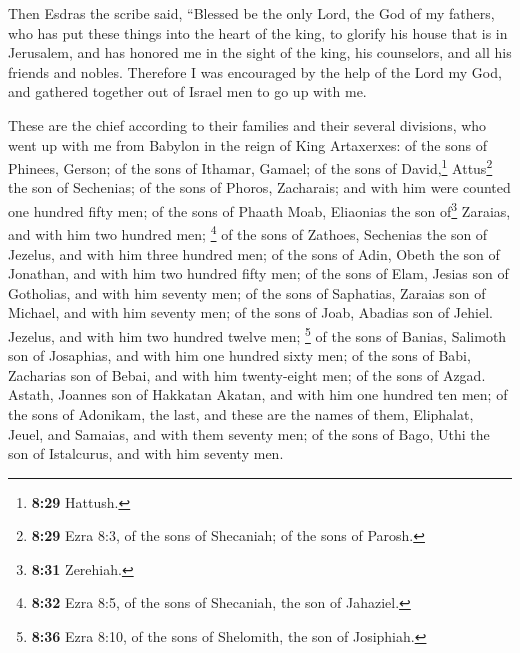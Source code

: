  Then Esdras the scribe said, ``Blessed be the only Lord,
the God of my fathers, who has put these things into the heart of the
king, to glorify his house that is in Jerusalem,  and has
honored me in the sight of the king, his counselors, and all his friends
and nobles.  Therefore I was encouraged by the help of
the Lord my God, and gathered together out of Israel men to go up with
me.

 These are the chief according to their families and
their several divisions, who went up with me from Babylon in the reign
of King Artaxerxes:  of the sons of Phinees, Gerson; of
the sons of Ithamar, Gamael; of the sons of David,\footnote{\textbf{8:29}
  Hattush.} Attus\footnote{\textbf{8:29} Ezra 8:3, of the sons of
  Shecaniah; of the sons of Parosh.} the son of Sechenias;
 of the sons of Phoros, Zacharais; and with him were
counted one hundred fifty men;  of the sons of Phaath
Moab, Eliaonias the son of\footnote{\textbf{8:31} Zerehiah.} Zaraias,
and with him two hundred men;  \footnote{\textbf{8:32}
  Ezra 8:5, of the sons of Shecaniah, the son of Jahaziel.} of the sons
of Zathoes, Sechenias the son of Jezelus, and with him three hundred
men; of the sons of Adin, Obeth the son of Jonathan, and with him two
hundred fifty men;  of the sons of Elam, Jesias son of
Gotholias, and with him seventy men;  of the sons of
Saphatias, Zaraias son of Michael, and with him seventy men;
 of the sons of Joab, Abadias son of Jehiel. Jezelus, and
with him two hundred twelve men;  \footnote{\textbf{8:36}
  Ezra 8:10, of the sons of Shelomith, the son of Josiphiah.} of the
sons of Banias, Salimoth son of Josaphias, and with him one hundred
sixty men;  of the sons of Babi, Zacharias son of Bebai,
and with him twenty-eight men;  of the sons of Azgad.
Astath, Joannes son of Hakkatan Akatan, and with him one hundred ten
men;  of the sons of Adonikam, the last, and these are
the names of them, Eliphalat, Jeuel, and Samaias, and with them seventy
men;  of the sons of Bago, Uthi the son of Istalcurus,
and with him seventy men.

